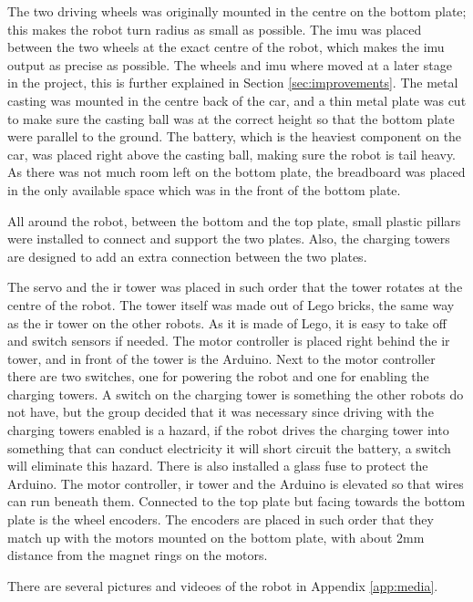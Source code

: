 The two driving wheels was originally mounted in the centre on the bottom plate; this makes the robot turn radius as small as possible. The \acrshort{imu} was placed between the two wheels at the exact centre of the robot, which makes the \acrshort{imu} output as precise as possible. The wheels and \acrshort{imu} where moved at a later stage in the project, this is further explained in Section \ref{sec:improvements}. The metal casting was mounted in the centre back of the car, and a thin metal plate was cut to make sure the casting ball was at the correct height so that the bottom plate were parallel to the ground. The battery, which is the heaviest component on the car, was placed right above the casting ball, making sure the robot is tail heavy. As there was not much room left on the bottom plate, the breadboard was placed in the only available space which was in the front of the bottom plate.

All around the robot, between the bottom and the top plate, small plastic pillars were installed to connect and support the two plates. Also, the charging towers are designed to add an extra connection between the two plates.

The servo and the \acrshort{ir} tower was placed in such order that the tower rotates at the centre of the robot. The tower itself was made out of Lego bricks, the same way as the \acrshort{ir} tower on the other robots. As it is made of Lego, it is easy to take off and switch sensors if needed. The motor controller is placed right behind the \acrshort{ir} tower, and in front of the tower is the Arduino. Next to the motor controller there are two switches, one for powering the robot and one for enabling the charging towers. A switch on the charging tower is something the other robots do not have, but the group decided that it was necessary since driving with the charging towers enabled is a hazard, if the robot drives the charging tower into something that can conduct electricity it will short circuit the battery, a switch will eliminate this hazard. There is also installed a glass fuse to protect the Arduino. The motor controller, \acrshort{ir} tower and the Arduino is elevated so that wires can run beneath them. Connected to the top plate but facing towards the bottom plate is the wheel encoders. The encoders are placed in such order that they match up with the motors mounted on the bottom plate, with about 2mm distance from the magnet rings on the motors.

There are several pictures and videoes of the robot in Appendix \ref{app:media}.

